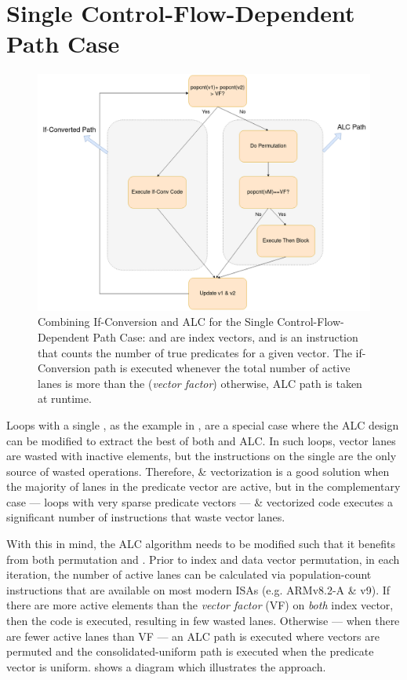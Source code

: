 \section{Single Control-Flow-Dependent Path Case}
\label{sec:single-if-statement-approach}
\begin{figure}[t]
  \centering
  \includegraphics[width=\textwidth]{Figures/03-approach/single_if.png}
  \caption{Combining If-Conversion and ALC for the Single Control-Flow-Dependent Path Case:  and  are index vectors, and  is an  instruction that counts the number of true predicates for a given vector. The if-Conversion path is executed whenever the total number of active lanes is more than the (\emph{vector factor}) otherwise, ALC path is taken at runtime.}
  \label{fig:single-if}
\end{figure}


Loops with a single \cpath, as the example in , are a special case where the ALC design can be modified to extract the best of both \ifconversion and ALC.
In such loops, vector lanes are wasted with inactive elements, but the instructions on the single \cpath are the only source of wasted operations.
Therefore, \ifconversion \& vectorization is a good solution when the majority of lanes in the predicate vector are active, but in the complementary case --- loops with very sparse predicate vectors --- \ifconverted \& vectorized code executes a significant number of instructions that waste vector lanes.



With this in mind, the ALC algorithm needs to be modified such that it benefits from both permutation and \ifconversion.
Prior to index and data vector permutation, in each iteration, the number of active lanes can be calculated via population-count instructions that are available on most modern ISAs (e.g. ARMv8.2-A \& v9).
If there are more active elements than the \emph{vector factor} (VF) on \emph{both} index vector, then the \ifconverted code is executed, resulting in few wasted lanes.
Otherwise --- when there are fewer active lanes than VF --- an ALC path is executed where vectors are permuted and the consolidated-uniform path is executed when the predicate vector is uniform.
 shows a diagram which illustrates the approach.

